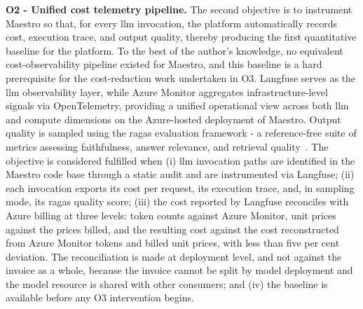 \textbf{O2 - Unified cost telemetry pipeline.} The second objective is to
instrument Maestro so that, for every \gls{llm} invocation, the platform
automatically records cost, execution trace, and output quality, thereby
producing the first quantitative baseline for the platform. To the best of the
author's knowledge, no equivalent cost-observability pipeline existed for
Maestro, and this baseline is a hard prerequisite for the cost-reduction work
undertaken in O3. Langfuse serves as the \gls{llm} observability layer, while
Azure Monitor aggregates infrastructure-level signals via OpenTelemetry,
providing a unified operational view across both \gls{llm} and compute
dimensions on the Azure-hosted deployment of Maestro.
Output quality is sampled using the \acrfull{ragas} evaluation
framework - a reference-free suite of metrics assessing faithfulness, answer relevance, and retrieval quality~\cite{es2023ragas}. The objective is considered fulfilled when
(i) \gls{llm} invocation paths are identified in the
Maestro code base through a static audit and are instrumented via Langfuse; (ii) each invocation exports
its cost per request, its execution trace, and, in sampling mode, its \gls{ragas}
quality score; (iii) the cost reported by Langfuse reconciles with Azure billing at three levels: token counts against Azure Monitor, unit prices against the prices billed, and the resulting cost against the cost reconstructed from Azure Monitor tokens and billed unit prices, with less than five per cent deviation. The reconciliation is made at deployment level, and not against the invoice as a whole, because the invoice cannot be split by model deployment and the model resource is shared with other consumers; and (iv) the baseline
is available before any O3 intervention begins.

